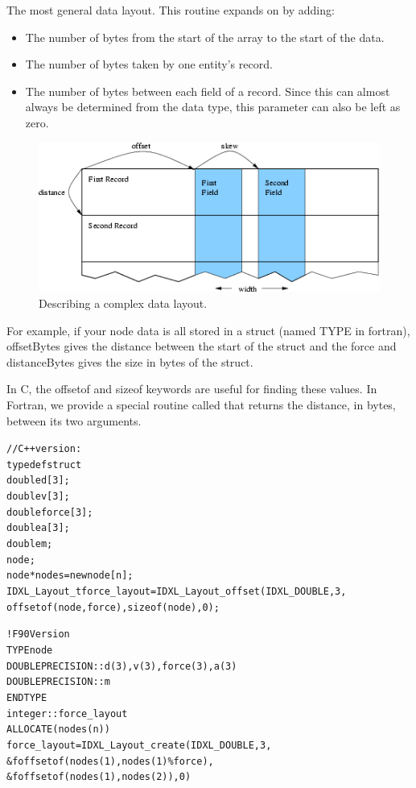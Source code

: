 The most general data layout.  This routine expands on  by adding: 

\begin{itemize}
  \item {} The number of bytes from the start of the array to the start of the data.
  \item {} The number of bytes taken by one entity's record.
  \item {} The number of bytes between each field of a record.  Since this can almost always be determined from the data type, this parameter can also be left as zero.
\end{itemize}

\begin{figure}[h]
\begin{center}
\includegraphics[width=5in]{fig/layout}
\end{center}
\caption{Describing a complex data layout.}
\label{fig:layout}
\end{figure}

For example, if your node data is all stored in a struct (named TYPE in fortran), offsetBytes gives the distance between the start of the struct and the force and distanceBytes gives the size in bytes of the struct.

In C, the offsetof and sizeof keywords are useful for finding these values.  In Fortran, we provide a special routine called  that returns the distance, in bytes, between its two arguments.

\begin{alltt}
// C++ version:
     typedef struct {
        double d[3];
        double v[3];
        double force[3];
        double a[3];
        double m;
     } node;
     node *nodes=new node[n];
     IDXL\_Layout\_t force\_layout=IDXL\_Layout\_offset(IDXL\_DOUBLE,3,
              offsetof(node,force),sizeof(node),0);

! F90 Version
     TYPE node 
        DOUBLE PRECISION :: d(3), v(3), force(3), a(3)
        DOUBLE PRECISION :: m
     END TYPE
     integer :: force\_layout
     ALLOCATE(nodes(n))
     force\_layout=IDXL\_Layout\_create(IDXL\_DOUBLE,3,
   &          foffsetof(nodes(1),nodes(1)\%force),
   &          foffsetof(nodes(1),nodes(2)),0)
\end{alltt}



